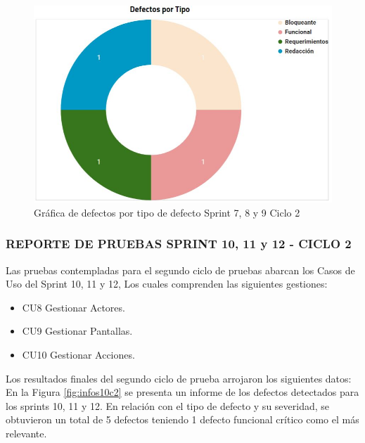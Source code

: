 \begin{figure}[H]
	\begin{center}
		\includegraphics[width=.75\textwidth]{images/pruebas/s7c2-2}
		\caption{Gráfica de defectos por tipo de defecto Sprint 7, 8 y 9  Ciclo 2}
		\label{fig:infos7c2-2}
	\end{center}
\end{figure}

\subsubsection{REPORTE DE PRUEBAS SPRINT 10, 11 y 12 - CICLO 2}

Las pruebas contempladas para el segundo ciclo de pruebas abarcan los Casos de Uso del Sprint 10, 11 y 12, Los cuales comprenden las siguientes gestiones:

\begin{itemize}
	\item CU8 Gestionar Actores.
	\item CU9 Gestionar Pantallas.
	\item CU10 Gestionar Acciones.
\end{itemize}

Los resultados finales del segundo ciclo de prueba arrojaron los siguientes datos:\\

En la Figura \ref{fig:infos10c2} se presenta un informe de los defectos detectados para los sprints 10, 11 y 12. En relación con el tipo de defecto y su severidad, se obtuvieron un total de 5 defectos teniendo 1 defecto funcional crítico como el más relevante.


